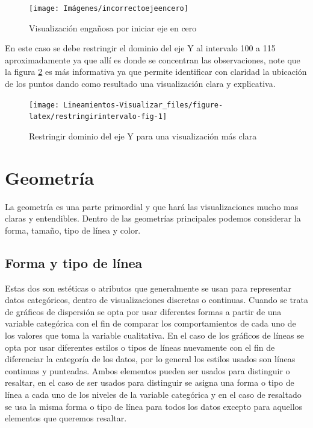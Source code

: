 \documentclass[
]{book}
\begin{document}
\begin{figure}

{\centering \texttt{[image: Imágenes/incorrectoejeencero]} 

}

\caption{Visualización engañosa por iniciar eje en cero}\label{fig:ejeenceroincorrecto-fig}
\end{figure}

En este caso se debe restringir el dominio del eje Y al intervalo 100 a 115 aproximadamente ya que allí es donde se concentran las observaciones, note que la figura \ref{fig:restringirintervalo-fig} es más informativa ya que permite identificar con claridad la ubicación de los puntos dando como resultado una visualización clara y explicativa.

\begin{figure}

{\centering \texttt{[image: Lineamientos-Visualizar\_files/figure-latex/restringirintervalo-fig-1]} 

}

\caption{Restringir dominio del eje Y para una visualización más clara}\label{fig:restringirintervalo-fig}
\end{figure}

\hypertarget{geometruxeda}{%
\section{Geometría}\label{geometruxeda}}

La geometría es una parte primordial y que hará las visualizaciones mucho mas claras y entendibles. Dentro de las geometrías principales podemos considerar la forma, tamaño, tipo de línea y color.

\hypertarget{forma-y-tipo-de-luxednea}{%
\subsection{Forma y tipo de línea}\label{forma-y-tipo-de-luxednea}}

Estas dos son estéticas o atributos que generalmente se usan para representar datos categóricos, dentro de visualizaciones discretas o continuas. Cuando se trata de gráficos de dispersión se opta por usar diferentes formas a partir de una variable categórica con el fin de comparar los comportamientos de cada uno de los valores que toma la variable cualitativa. En el caso de los gráficos de líneas se opta por usar diferentes estilos o tipos de líneas nuevamente con el fin de diferenciar la categoría de los datos, por lo general los estilos usados son líneas continuas y punteadas. Ambos elementos pueden ser usados para distinguir o resaltar, en el caso de ser usados para distinguir se asigna una forma o tipo de línea a cada uno de los niveles de la variable categórica y en el caso de resaltado se usa la misma forma o tipo de línea para todos los datos excepto para aquellos elementos que queremos resaltar.
\end{document}

